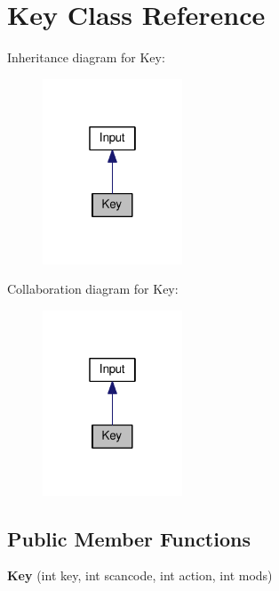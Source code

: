 \hypertarget{classKey}{}\section{Key Class Reference}
\label{classKey}


Inheritance diagram for Key\+:
\nopagebreak
\begin{figure}[H]
\begin{center}
\leavevmode
\includegraphics[width=118pt]{classKey__inherit__graph}
\end{center}
\end{figure}


Collaboration diagram for Key\+:
\nopagebreak
\begin{figure}[H]
\begin{center}
\leavevmode
\includegraphics[width=118pt]{classKey__coll__graph}
\end{center}
\end{figure}
\subsection*{Public Member Functions}
\begin{DoxyCompactItemize}
\item 
{\bfseries Key} (int key, int scancode, int action, int mods)\hypertarget{classKey_a21c1c991388635db9b0690de6ff3292a}{}\label{classKey_a21c1c991388635db9b0690de6ff3292a}

\end{DoxyCompactItemize}
